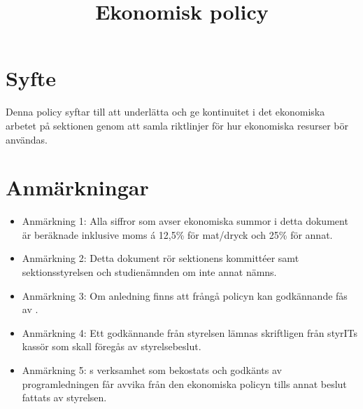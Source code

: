 \documentclass[11pt, includeaddress]{classes/cthit}
\begin{document}
\title{Ekonomisk policy}
\maketitle

\thispagestyle{empty}

\newpage

\makeheadfoot%

\setcounter{tocdepth}{2}
\setcounter{page}{1}
\tableofcontents

\newpage

\section{Syfte}
Denna policy syftar till att underlätta och ge kontinuitet i det ekonomiska arbetet på sektionen genom att samla riktlinjer för hur ekonomiska resurser bör användas.

\section{Anmärkningar}
\begin{itemize}
	\item Anmärkning 1: Alla siffror som avser ekonomiska summor i detta dokument är beräknade inklusive moms á 12,5\% för mat/dryck och 25\% för annat.
	\item Anmärkning 2: Detta dokument rör sektionens kommittéer
          samt sektionsstyrelsen \STYRIT{} och studienämnden \SNIT{}
          om inte annat nämns.
	\item Anmärkning 3: Om anledning finns att frångå policyn kan godkännande fås av \STYRIT{}.
	\item Anmärkning 4: Ett godkännande från styrelsen lämnas skriftligen från styrITs kassör som skall föregås av styrelsebeslut.
	\item Anmärkning 5: \SNIT{}s verksamhet som bekostats och godkänts av programledningen får avvika från den ekonomiska policyn tills annat beslut fattats av styrelsen.
\end{itemize}
\end{document}
